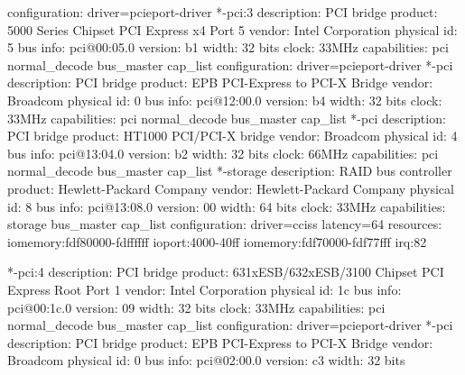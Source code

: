 \documentclass[mingoth,a4paper]{jsarticle}
\begin{document}
{{{{{{\begin{commandline}
             configuration: driver=pcieport-driver
        *-pci:3
             description: PCI bridge
             product: 5000 Series Chipset PCI Express x4 Port 5
             vendor: Intel Corporation
             physical id: 5
             bus info: pci@00:05.0
             version: b1
             width: 32 bits
             clock: 33MHz
             capabilities: pci normal_decode bus_master cap_list
             configuration: driver=pcieport-driver
           *-pci
                description: PCI bridge
                product: EPB PCI-Express to PCI-X Bridge
                vendor: Broadcom
                physical id: 0
                bus info: pci@12:00.0
                version: b4
                width: 32 bits
                clock: 33MHz
                capabilities: pci normal_decode bus_master cap_list
              *-pci
                   description: PCI bridge
                   product: HT1000 PCI/PCI-X bridge
                   vendor: Broadcom
                   physical id: 4
                   bus info: pci@13:04.0
                   version: b2
                   width: 32 bits
                   clock: 66MHz
                   capabilities: pci normal_decode bus_master cap_list
              *-storage
                   description: RAID bus controller
                   product: Hewlett-Packard Company
                   vendor: Hewlett-Packard Company
                   physical id: 8
                   bus info: pci@13:08.0
                   version: 00
                   width: 64 bits
                   clock: 33MHz
                   capabilities: storage bus_master cap_list
                   configuration: driver=cciss latency=64
                   resources: iomemory:fdf80000-fdffffff ioport:4000-40ff iomemory:fdf70000-fdf77fff irq:82
\end{commandline}
\begin{commandline}
        *-pci:4
             description: PCI bridge
             product: 631xESB/632xESB/3100 Chipset PCI Express Root Port 1
             vendor: Intel Corporation
             physical id: 1c
             bus info: pci@00:1c.0
             version: 09
             width: 32 bits
             clock: 33MHz
             capabilities: pci normal_decode bus_master cap_list
             configuration: driver=pcieport-driver
           *-pci
                description: PCI bridge
                product: EPB PCI-Express to PCI-X Bridge
                vendor: Broadcom
                physical id: 0
                bus info: pci@02:00.0
                version: c3
                width: 32 bits

\end{commandline}}}}}}}
\end{document}
